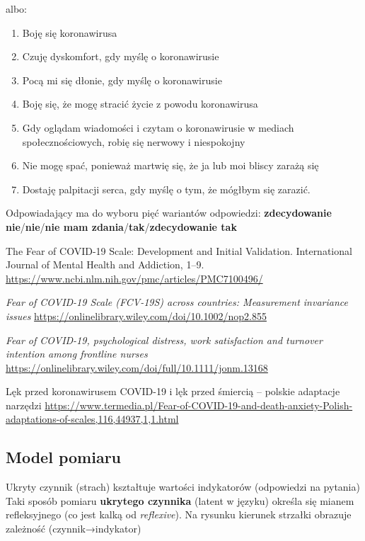 \documentclass[
  openany]{book}
\begin{document}
albo:

\begin{enumerate}
\def\labelenumi{\arabic{enumi}.}
\item
  Boję się koronawirusa
\item
  Czuję dyskomfort, gdy myślę o koronawirusie
\item
  Pocą mi się dłonie, gdy myślę o koronawirusie
\item
  Boję się, że mogę stracić życie z powodu koronawirusa
\item
  Gdy oglądam wiadomości i czytam o koronawirusie w mediach
  społecznościowych, robię się nerwowy i niespokojny
\item
  Nie mogę spać, ponieważ martwię się, że ja lub moi bliscy zarażą się
\item
  Dostaję palpitacji serca, gdy myślę o tym, że mógłbym się zarazić.
\end{enumerate}

Odpowiadający ma do wyboru pięć wariantów odpowiedzi:
\textbf{zdecydowanie nie}/\textbf{nie}/\textbf{nie mam zdania}/\textbf{tak}/\textbf{zdecydowanie tak}

The Fear of COVID-19 Scale: Development and Initial Validation.
International Journal of
Mental Health and Addiction, 1--9.
\url{https://www.ncbi.nlm.nih.gov/pmc/articles/PMC7100496/}

\emph{Fear of COVID-19 Scale (FCV-19S) across countries: Measurement invariance issues}
\url{https://onlinelibrary.wiley.com/doi/10.1002/nop2.855}

\emph{Fear of COVID-19, psychological distress, work satisfaction and turnover
intention among frontline nurses}
\url{https://onlinelibrary.wiley.com/doi/full/10.1111/jonm.13168}

Lęk przed koronawirusem COVID-19
i lęk przed śmiercią -- polskie adaptacje narzędzi
\url{https://www.termedia.pl/Fear-of-COVID-19-and-death-anxiety-Polish-adaptations-of-scales,116,44937,1,1.html}

\hypertarget{model-pomiaru}{%
\subsection{Model pomiaru}\label{model-pomiaru}}

Ukryty czynnik (strach) kształtuje wartości indykatorów (odpowiedzi na pytania)
Taki sposób pomiaru \textbf{ukrytego czynnika} (latent w języku) określa się
mianem refleksyjnego (co jest kalką od \emph{reflexive}). Na rysunku
kierunek strzałki obrazuje zależność (czynnik→indykator)
\end{document}
